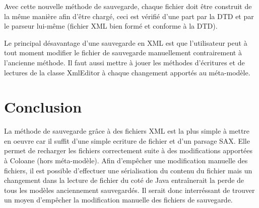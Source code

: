 \documentclass{article}
\begin{document}
Avec cette nouvelle m\'ethode de sauvegarde, chaque fichier doit \^etre construit de la m\^eme mani\`ere afin d'\^etre charg\'e, ceci est v\'erifi\'e d'une part par la DTD et par le parseur lui-m\^eme (fichier XML bien form\'e et conforme \`a la DTD).

Le principal d\'esavantage d'une sauvegarde en XML est que l'utilisateur peut \`a tout moment modifier le fichier de sauvegarde manuellement contrairement \`a l'ancienne m\'ethode.
Il faut aussi mettre \`a jouer les m\'ethodes d'\'ecritures et de lectures de la classe XmlEditor \`a chaque changement apport\'es au m\'eta-mod\`ele.


\section{Conclusion}

La m\'ethode de sauvegarde gr\^ace \`a des fichiers XML est la plus simple \`a mettre en oeuvre car il suffit d'une simple ecriture de fichier et d'un parsage SAX.
Elle permet de recharger les fichiers correctement suite \`a des modifications apport\'ees \`a Coloane (hors m\'eta-mod\`ele).
Afin d'emp\^echer une modification manuelle des fichiers, il est possible d'effectuer une s\'erialisation du contenu du fichier mais un changement dans la lecture de fichier du cot\'e de Java entraînerait la perde de tous les mod\`eles anciennement sauvegard\'es.
Il serait donc interr\'essant de trouver un moyen d'emp\^echer la modification manuelle des fichiers de sauvegarde.
\end{document}
